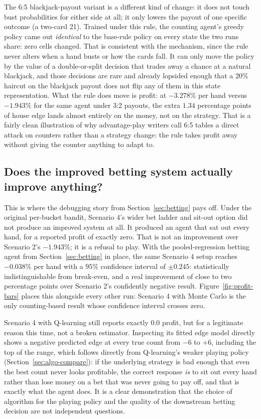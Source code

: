 \documentclass[conference,a4paper]{IEEEtran}
\begin{document}
The 6:5 blackjack-payout variant is a different kind of change: it does not
touch bust probabilities for either side at all; it only lowers the payout
of one specific outcome (a two-card 21). Trained under this rule, the
counting agent's greedy policy came out \emph{identical} to the base-rule
policy on every state the two runs share: zero cells changed. That is
consistent with the mechanism, since the rule never alters when a hand busts
or how the cards fall. It can only move the policy by the value of a
double-or-split decision that trades away a chance at a natural blackjack,
and those decisions are rare and already lopsided enough that a 20\% haircut
on the blackjack payout does not flip any of them in this state
representation. What the rule does move is profit: at $-3.278\%$ per hand
versus $-1.943\%$ for the same agent under 3:2 payouts, the extra $1.34$
percentage points of house edge lands almost entirely on the money, not on
the strategy. That is a fairly clean illustration of why advantage-play
writers call 6:5 tables a direct attack on counters rather than a strategy
change: the rule takes profit away without giving the counter anything to
adapt to.

\subsection{Does the improved betting system actually improve anything?}
This is where the debugging story from Section~\ref{sec:betting} pays off.
Under the original per-bucket bandit, Scenario 4's wider bet ladder and
sit-out option did not produce an improved system at all. It produced an
agent that sat out every hand, for a reported profit of exactly zero. That
is not an improvement over Scenario 2's $-1.943\%$; it is a refusal to
play. With the pooled-regression betting agent from Section~\ref{sec:betting}
in place, the same Scenario 4 setup reaches $-0.038\%$ per hand with a
$95\%$ confidence interval of $\pm 0.245$: statistically indistinguishable
from break-even, and a real improvement of close to two percentage points
over Scenario 2's confidently negative result. Figure~\ref{fig:profit-bars}
places this alongside every other run: Scenario 4 with Monte Carlo is the only
counting-based result whose confidence interval crosses zero.

Scenario 4 with Q-learning still reports exactly $0.0$ profit, but for a
legitimate reason this time, not a broken estimator. Inspecting its fitted
edge model directly shows a negative predicted edge at every true count
from $-6$ to $+6$, including the top of the range, which follows directly
from Q-learning's weaker playing policy (Section~\ref{sec:algo-compare}): if
the underlying strategy is bad enough that even the best count never looks
profitable, the correct response \emph{is} to sit out every hand rather
than lose money on a bet that was never going to pay off, and that is
exactly what the agent does. It is a clear demonstration that the choice
of algorithm for the playing policy and the quality of the downstream betting
decision are not independent questions.
\end{document}
